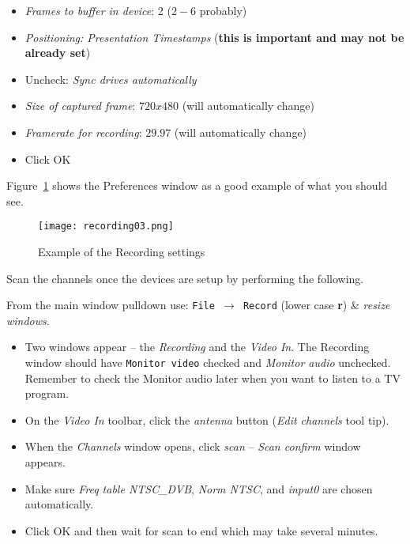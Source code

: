 \begin{enumerate}
\begin{itemize}
        \item \textit{Frames to buffer in device}: 2 ($2-6$ probably)
        \item \textit{Positioning: Presentation Timestamps} (\textbf{this is important and may not be already set})
        \item Uncheck: \textit{Sync drives automatically}
        \item \textit{Size of captured frame}: $720x480$ (will automatically change)
        \item \textit{Framerate for recording}: $29.97$ (will automatically change)
        \item Click OK
    \end{itemize}
\end{enumerate}

Figure~\ref{fig:recording03} shows the Preferences window as a good example of what you should see.

\begin{figure}[htpb]
    \centering
    \texttt{[image: recording03.png]}
    \caption{Example of the Recording settings}
    \label{fig:recording03}
\end{figure}

Scan the channels once the devices are setup by performing the following.

From the main window pulldown use:  \texttt{File $\rightarrow$ Record}  (lower case \textbf{r}) \& \textit{resize windows}.

\begin{itemize}
    \item Two windows appear --  the \textit{Recording} and the \textit{Video In}.  The Recording window should have \texttt{Monitor video} checked and \textit{Monitor audio} unchecked.  Remember to check the Monitor audio later when you want to listen to a TV program.
    \item On the \textit{Video In} toolbar, click the \textit{antenna} button (\textit{Edit channels} tool tip).
    \item When the \textit{Channels} window opens, click \textit{scan} -- \textit{Scan confirm} window appears.
    \item Make sure \textit{Freq table NTSC\_DVB}, \textit{Norm NTSC}, and \textit{input0} are chosen automatically.
    \item Click OK and then wait for scan to end which may take several minutes.
\end{itemize}

